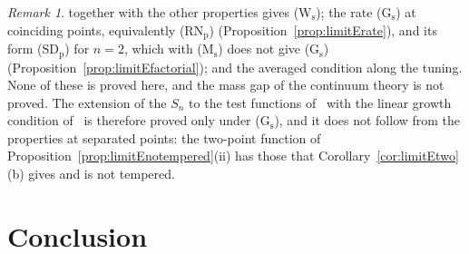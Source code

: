 \documentclass[aps,prd,twocolumn,superscriptaddress,nofootinbib,longbibliography,floatfix,amsmath,amssymb,10pt]{revtex4-2}
\theoremstyle{definition}
\theoremstyle{remark}
\newtheorem{remark}[theorem]{Remark}
\begin{document}
\begin{remark}
together with the other properties gives (W$_{\mathrm s}$); the rate
(G$_{\mathrm s}$) at coinciding points, equivalently (RN$_{\mathrm p}$)
(Proposition~\ref{prop:limitErate}), and its form (SD$_{\mathrm p}$) for
$n=2$, which with (M$_{\mathrm s}$) does not give (G$_{\mathrm s}$)
(Proposition~\ref{prop:limitEfactorial}); and the averaged condition along
the tuning. None of these is proved
here, and the mass gap of the continuum theory is not proved. The extension
of the $S_n$ to the test functions of~\cite{OS73} with the linear growth
condition of~\cite{OS75} is therefore proved only under (G$_{\mathrm s}$),
and it does not follow from the properties at separated points: the
two-point function of Proposition~\ref{prop:limitEnotempered}(ii) has those
that Corollary~\ref{cor:limitEtwo}(b) gives and is not tempered.
\end{remark}









\section{Conclusion}\label{sec:conclusion}
\end{document}

